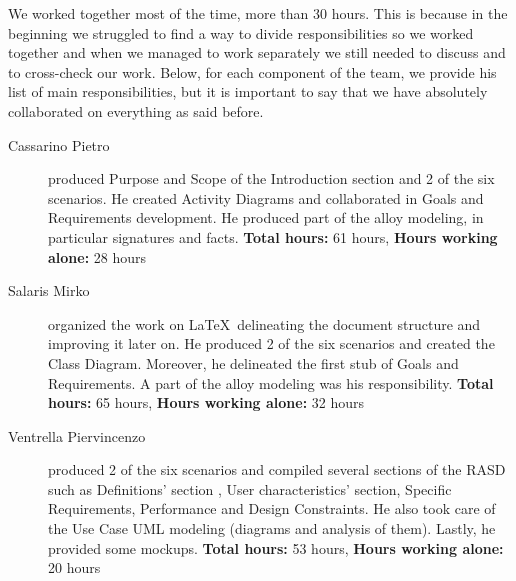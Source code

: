 We worked together most of the time, more than 30 hours. This is because in the beginning we struggled to find a way to divide responsibilities so we worked together and when we managed to work separately we still needed to discuss and to cross-check our work.\newline
Below, for each component of the team, we provide his list of main responsibilities, but it is important to say that we have absolutely collaborated on everything as said before.

\begin{description}
	\item[Cassarino Pietro] produced Purpose and Scope of the Introduction section and 2 of the six scenarios. He created Activity Diagrams and collaborated in Goals and Requirements development. He produced part of the alloy modeling, in particular signatures and facts. \newline
	\textbf{Total hours:} 61 hours, \textbf{Hours working alone:} 28 hours
	\item[Salaris Mirko] organized the work on \LaTeX\ delineating the document structure and improving it later on. He produced 2 of the six scenarios and created the Class Diagram. Moreover, he delineated the first stub of Goals and Requirements. A part of the alloy modeling was his responsibility.\newline
	\textbf{Total hours:} 65 hours, \textbf{Hours working alone:} 32 hours
	\item[Ventrella Piervincenzo] produced 2 of the six scenarios and compiled several sections of the RASD such as Definitions' section , User characteristics' section, Specific Requirements, Performance and Design Constraints. He also took care of the Use Case UML modeling (diagrams and analysis of them). Lastly, he provided some mockups. \newline
	\textbf{Total hours:} 53 hours, \textbf{Hours working alone:} 20 hours
\end{description}